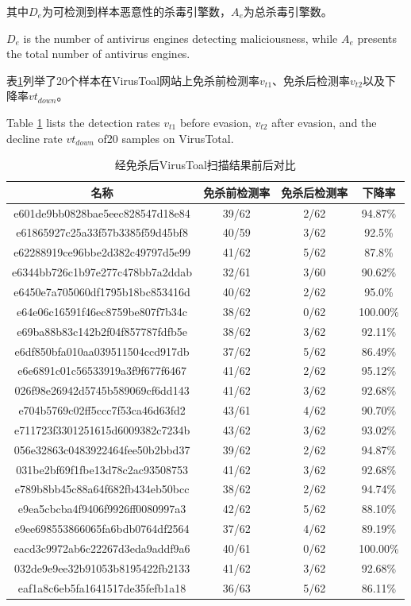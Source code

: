 其中$D_e$为可检测到样本恶意性的杀毒引擎数，$A_e$为总杀毒引擎数。

$D_e$ is the number of antivirus engines detecting maliciousness, while $A_e$ presents the total number of antivirus engines.

表\ref{tab:5.13}列举了20个样本在VirusToal网站上免杀前检测率$v_{t1}$、免杀后检测率$v_{t2}$以及下降率$vt_{down}$。

Table \ref{tab:5.13} lists the detection rates $v_{t1}$ before evasion, $v_{t2}$ after evasion, and the decline rate $vt_{down}$ of20 samples on VirusTotal.

\begin{table}[htbp]
	\centering
	\caption{经免杀后VirusToal扫描结果前后对比}
	\label{tab:5.13}
	\begin{tabular*}{0.9\textwidth}{@{\extracolsep{\fill}}cccc}
		\toprule
		名称 & 免杀前检测率 & 免杀后检测率 & 下降率 \\
		\midrule
		e601de9bb0828bae5eec828547d18e84 & 39/62 & 2/62 & 94.87\% \\
		e61865927c25a33f57b3385f59d45bf8 & 40/59 & 3/62 & 92.5\% \\
		e62288919ce96bbe2d382c49797d5e99 & 41/62 & 5/62 & 87.8\% \\
		e6344bb726c1b97e277c478bb7a2ddab & 32/61 & 3/60 & 90.62\% \\
		e6450e7a705060df1795b18bc853416d & 40/62 & 2/62 & 95.0\% \\
		e64e06c16591f46ec8759be807f7b34c & 38/62 & 0/62 & 100.00\% \\
		e69ba88b83c142b2f04f857787fdfb5e & 38/62 & 3/62 & 92.11\% \\
		e6df850bfa010aa039511504ccd917db & 37/62 & 5/62 & 86.49\% \\
		e6e6891c01c56533919a3f9f677f6467 & 41/62 & 2/62 & 95.12\% \\
		026f98e26942d5745b589069cf6dd143 & 41/62 & 3/62 & 92.68\% \\
		e704b5769c02ff5ccc7f53ca46d63fd2 & 43/61 & 4/62 & 90.70\% \\
		e711723f3301251615d6009382c7234b & 43/62 & 3/62 & 93.02\% \\
		056e32863c0483922464fee50b2bbd37 & 39/62 & 2/62 & 94.87\% \\
		031be2bf69f1fbe13d78c2ac93508753 & 41/62 & 3/62 & 92.68\% \\
		e789b8bb45c88a64f682fb434eb50bcc & 38/62 & 2/62 & 94.74\% \\
		e9ea5cbcba4f9406f9926ff0080997a3 & 42/62 & 5/62 & 88.10\% \\
		e9ee698553866065fa6bdb0764df2564 & 37/62 & 4/62 & 89.19\% \\
		eacd3c9972ab6c22267d3eda9addf9a6 & 40/61 & 0/62 & 100.00\% \\
		032de9e9ee32b91053b8195422fb2133 & 41/62 & 3/62 & 92.68\% \\
		eaf1a8c6eb5fa1641517de35fefb1a18 & 36/63 & 5/62 & 86.11\% \\
		\bottomrule
	\end{tabular*}
\end{table}

